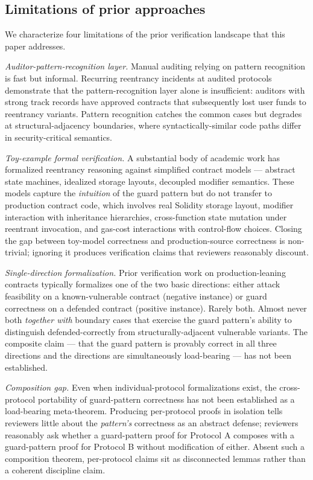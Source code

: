 \subsection{Limitations of prior
approaches}\label{limitations-of-prior-approaches}

We characterize four limitations of the prior verification landscape
that this paper addresses.

\emph{Auditor-pattern-recognition layer.} Manual auditing relying on
pattern recognition is fast but informal. Recurring reentrancy incidents
at audited protocols demonstrate that the pattern-recognition layer
alone is insufficient: auditors with strong track records have approved
contracts that subsequently lost user funds to reentrancy variants.
Pattern recognition catches the common cases but degrades at
structural-adjacency boundaries, where syntactically-similar code paths
differ in security-critical semantics.

\emph{Toy-example formal verification.} A substantial body of academic
work has formalized reentrancy reasoning against simplified contract
models --- abstract state machines, idealized storage layouts, decoupled
modifier semantics. These models capture the \emph{intuition} of the
guard pattern but do not transfer to production contract code, which
involves real Solidity storage layout, modifier interaction with
inheritance hierarchies, cross-function state mutation under reentrant
invocation, and gas-cost interactions with control-flow choices. Closing
the gap between toy-model correctness and production-source correctness
is non-trivial; ignoring it produces verification claims that reviewers
reasonably discount.

\emph{Single-direction formalization.} Prior verification work on
production-leaning contracts typically formalizes one of the two basic
directions: either attack feasibility on a known-vulnerable contract
(negative instance) or guard correctness on a defended contract
(positive instance). Rarely both. Almost never both \emph{together with}
boundary cases that exercise the guard pattern's ability to distinguish
defended-correctly from structurally-adjacent vulnerable variants. The
composite claim --- that the guard pattern is provably correct in all
three directions and the directions are simultaneously load-bearing ---
has not been established.

\emph{Composition gap.} Even when individual-protocol formalizations
exist, the cross-protocol portability of guard-pattern correctness has
not been established as a load-bearing meta-theorem. Producing
per-protocol proofs in isolation tells reviewers little about the
\emph{pattern's} correctness as an abstract defense; reviewers
reasonably ask whether a guard-pattern proof for Protocol A composes
with a guard-pattern proof for Protocol B without modification of
either. Absent such a composition theorem, per-protocol claims sit as
disconnected lemmas rather than a coherent discipline claim.

